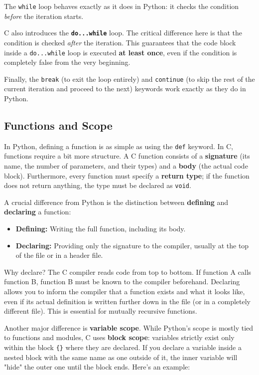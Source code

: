 The \texttt{while} loop behaves exactly as it does in Python: it checks the condition \textit{before} the iteration starts.

C also introduces the \textbf{\texttt{do...while}} loop. The critical difference here is that the condition is checked \textit{after} the iteration. This guarantees that the code block inside a \texttt{do...while} loop is executed \textbf{at least once}, even if the condition is completely false from the very beginning.

Finally, the \texttt{break} (to exit the loop entirely) and \texttt{continue} (to skip the rest of the current iteration and proceed to the next) keywords work exactly as they do in Python.



\subsection{Functions and Scope}

In Python, defining a function is as simple as using the \texttt{def} keyword. In C, functions require a bit more structure. A C function consists of a \textbf{signature} (its name, the number of parameters, and their types) and a \textbf{body} (the actual code block). Furthermore, every function must specify a \textbf{return type}; if the function does not return anything, the type must be declared as \texttt{void}.

A crucial difference from Python is the distinction between \textbf{defining} and \textbf{declaring} a function:
\begin{itemize}
    \item[-] \textbf{Defining:} Writing the full function, including its body.
    \item[-] \textbf{Declaring:} Providing only the signature to the compiler, usually at the top of the file or in a header file.
\end{itemize}
Why declare? The C compiler reads code from top to bottom. If function A calls function B, function B must be known to the compiler beforehand. Declaring allows you to inform the compiler that a function exists and what it looks like, even if its actual definition is written further down in the file (or in a completely different file). This is essential for mutually recursive functions.

Another major difference is \textbf{variable scope}. While Python's scope is mostly tied to functions and modules, C uses \textbf{block scope}: variables strictly exist only within the block \texttt{\{\}} where they are declared. If you declare a variable inside a nested block with the same name as one outside of it, the inner variable will "hide" the outer one until the block ends. Here's an example:

